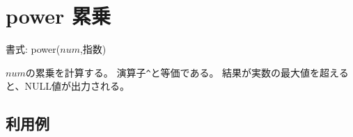
%

\section{power 累乗\label{sect:power}}

書式: power($num$,指数)

$num$の累乗を計算する。
演算子\verb|^|と等価である。
結果が実数の最大値を超えると、NULL値が出力される。

\subsection*{利用例}


%

